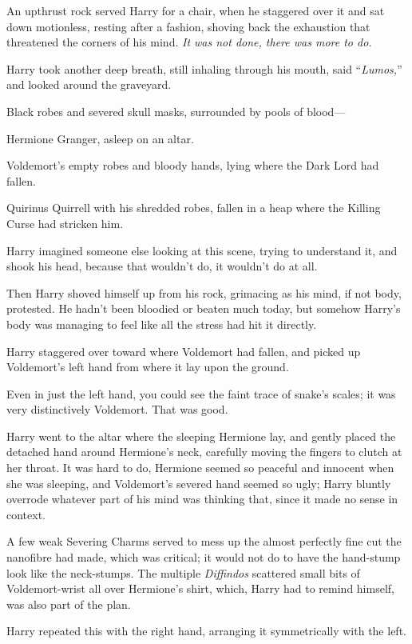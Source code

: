 An upthrust rock served Harry for a chair, when he staggered over it and sat down motionless, resting after a fashion, shoving back the exhaustion that threatened the corners of his mind. \emph{It was not done, there was more to do.}

Harry took another deep breath, still inhaling through his mouth, said “\emph{Lumos,}” and looked around the graveyard.

Black robes and severed skull masks, surrounded by pools of blood—

Hermione Granger, asleep on an altar.

Voldemort’s empty robes and bloody hands, lying where the Dark Lord had fallen.

Quirinus Quirrell with his shredded robes, fallen in a heap where the Killing Curse had stricken him.

Harry imagined someone else looking at this scene, trying to understand it, and shook his head, because that wouldn’t do, it wouldn’t do at all.

Then Harry shoved himself up from his rock, grimacing as his mind, if not body, protested. He hadn’t been bloodied or beaten much today, but somehow Harry’s body was managing to feel like all the stress had hit it directly.

Harry staggered over toward where Voldemort had fallen, and picked up Voldemort’s left hand from where it lay upon the ground.

Even in just the left hand, you could see the faint trace of snake’s scales; it was very distinctively Voldemort. That was good.

Harry went to the altar where the sleeping Hermione lay, and gently placed the detached hand around Hermione’s neck, carefully moving the fingers to clutch at her throat. It was hard to do, Hermione seemed so peaceful and innocent when she was sleeping, and Voldemort’s severed hand seemed so ugly; Harry bluntly overrode whatever part of his mind was thinking that, since it made no sense in context.

A few weak Severing Charms served to mess up the almost perfectly fine cut the nanofibre had made, which was critical; it would not do to have the hand-stump look like the neck-stumps. The multiple \emph{Diffindos} scattered small bits of Voldemort-wrist all over Hermione’s shirt, which, Harry had to remind himself, was also part of the plan.

Harry repeated this with the right hand, arranging it symmetrically with the left.


